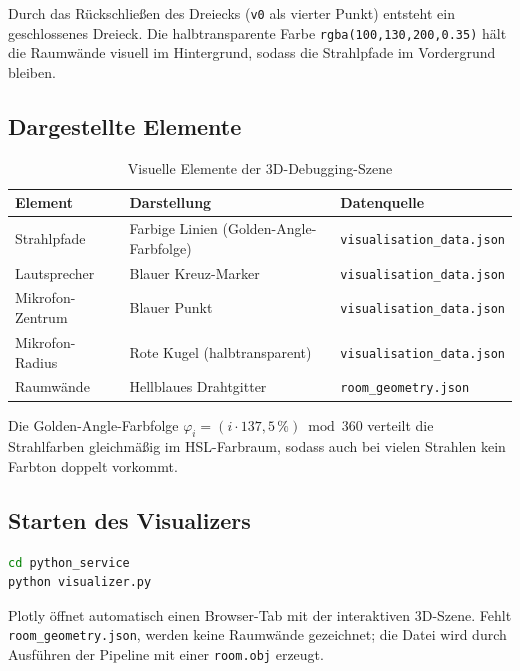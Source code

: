 Durch das R\"uckschlie\ss{}en des Dreiecks (\texttt{v0} als vierter Punkt) entsteht
ein geschlossenes Dreieck. Die halbtransparente Farbe \texttt{rgba(100,130,200,0.35)}
h\"alt die Raumw\"ande visuell im Hintergrund, sodass die Strahlpfade im Vordergrund
bleiben.

\subsection{Dargestellte Elemente}

\begin{table}[H]
    \centering
    \begin{tabular}{|l|l|l|}
        \hline
        \textbf{Element} & \textbf{Darstellung} & \textbf{Datenquelle} \\
        \hline
        Strahlpfade & Farbige Linien (Golden-Angle-Farbfolge) & \texttt{visualisation\_data.json} \\
        \hline
        Lautsprecher & Blauer Kreuz-Marker & \texttt{visualisation\_data.json} \\
        \hline
        Mikrofon-Zentrum & Blauer Punkt & \texttt{visualisation\_data.json} \\
        \hline
        Mikrofon-Radius & Rote Kugel (halbtransparent) & \texttt{visualisation\_data.json} \\
        \hline
        Raumw\"ande & Hellblaues Drahtgitter & \texttt{room\_geometry.json} \\
        \hline
    \end{tabular}
    \caption{Visuelle Elemente der 3D-Debugging-Szene}
\end{table}

Die Golden-Angle-Farbfolge $\varphi_i = (i \cdot 137{,}5\,\%) \bmod 360$
verteilt die Strahlfarben gleichm\"a\ss{}ig im HSL-Farbraum, sodass auch bei
vielen Strahlen kein Farbton doppelt vorkommt.

\subsection{Starten des Visualizers}

\begin{lstlisting}[language=bash]
cd python_service
python visualizer.py
\end{lstlisting}

Plotly \"offnet automatisch einen Browser-Tab mit der interaktiven 3D-Szene.
Fehlt \texttt{room\_geometry.json}, werden keine Raumw\"ande gezeichnet;
die Datei wird durch Ausf\"uhren der Pipeline mit einer \texttt{room.obj} erzeugt.

